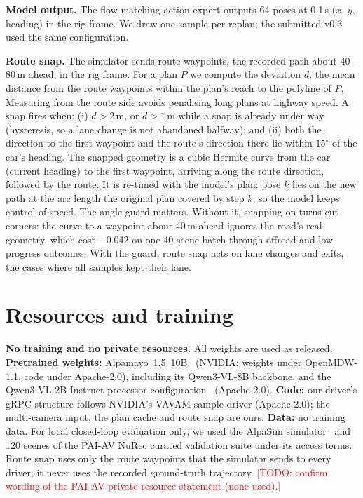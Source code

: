 \documentclass{article}
\newcommand{\todo}[1]{\textcolor{red}{[TODO: #1]}}
\begin{document}
\textbf{Model output.} The flow-matching action expert outputs 64 poses at 0.1\,s ($x$, $y$, heading) in the rig
frame. We draw one sample per replan; the submitted v0.3 used the same configuration.

\textbf{Route snap.} The simulator sends route waypoints, the recorded path about 40--80\,m ahead, in the rig frame.
For a plan $P$ we compute the deviation $d$, the mean distance from the route waypoints within the plan's reach to the
polyline of $P$. Measuring from the route side avoids penalising long plans at highway speed. A snap fires when:
(i) $d > 2$\,m, or $d > 1$\,m while a snap is already under way (hysteresis, so a lane change is not abandoned
halfway); and (ii) both the direction to the first waypoint and the route's direction there lie within $15^\circ$ of
the car's heading. The snapped geometry is a cubic Hermite curve from the car (current heading) to the first
waypoint, arriving along the route direction, followed by the route. It is re-timed with the model's plan: pose $k$
lies on the new path at the arc length the original plan covered by step $k$, so the model keeps control of speed.
The angle guard matters. Without it, snapping on turns cut corners: the curve to a waypoint about 40\,m ahead ignores
the road's real geometry, which cost $-$0.042 on one 40-scene batch through offroad and low-progress outcomes. With
the guard, route snap acts on lane changes and exits, the cases where all samples kept their lane.

\section{Resources and training}
\textbf{No training and no private resources.} All weights are used as released. \textbf{Pretrained weights:}
Alpamayo~1.5~10B~\cite{alpamayo15} (NVIDIA; weights under OpenMDW-1.1, code under Apache-2.0), including its
Qwen3-VL-8B backbone, and the Qwen3-VL-2B-Instruct processor configuration~\cite{qwen3vl} (Apache-2.0).
\textbf{Code:} our driver's gRPC structure follows NVIDIA's VAVAM sample driver (Apache-2.0); the multi-camera
input, the plan cache and route snap are ours. \textbf{Data:} no training data. For local closed-loop evaluation
only, we used the AlpaSim simulator~\cite{alpasim} and 120 scenes of the PAI-AV NuRec curated validation suite
under its access terms. Route snap uses only the route waypoints that the simulator sends to every driver; it never
uses the recorded ground-truth trajectory. \todo{confirm wording of the PAI-AV private-resource statement (none
used).}
\end{document}
